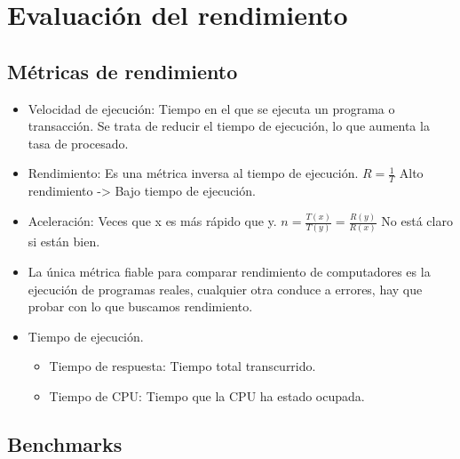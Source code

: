 \documentclass[12pt, twoside, openright]{report} %
\begin{document}
\section{Evaluación del rendimiento}

\subsection{Métricas de rendimiento}

\begin{itemize}

	\item Velocidad de ejecución: Tiempo en el que se ejecuta un programa o
	      transacción. Se trata de reducir el tiempo de ejecución, lo que
	      aumenta la tasa de procesado.
	\item Rendimiento: Es una métrica inversa al tiempo de ejecución.
	      \(R= \frac 1 T\) Alto rendimiento -\textgreater{} Bajo tiempo de
	      ejecución.
	\item Aceleración: Veces que x es más rápido que y.
	      \(n=\frac {T(x)} {T(y)}=\frac {R(y)} {R(x)}\) No está claro si están
	      bien.
	\item La única métrica fiable para comparar rendimiento de computadores es
	      la ejecución de programas reales, cualquier otra conduce a errores,
	      hay que probar con lo que buscamos rendimiento.
	\item Tiempo de ejecución.

	      \begin{itemize}

		      \item Tiempo de respuesta: Tiempo total transcurrido.
		      \item Tiempo de CPU: Tiempo que la CPU ha estado ocupada.
	      \end{itemize}
\end{itemize}

\subsection{Benchmarks}
\end{document}
